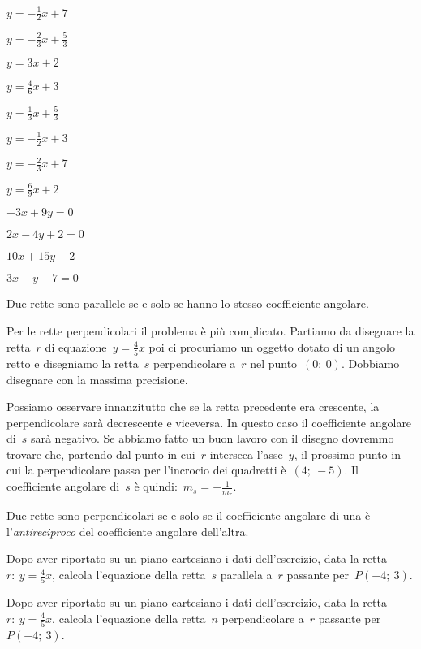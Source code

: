 \begin{multicols}{4}
 \TabPositions{0.6cm}
 \begin{enumeratea}
 \item \(y=-\frac{1}{2}x + 7\)
 \item \(y=-\frac{2}{3}x + \frac{5}{3}\)
 \item \(y={3}x + 2\)
 \item \(y=\frac{4}{6}x + 3\)
 \item \(y=\frac{1}{3}x + \frac{5}{3}\)
 \item \(y=-\frac{1}{2}x + 3\)
 \item \(y=-\frac{2}{3}x + 7\)
 \item \(y=\frac{6}{9}x + 2\)
 \item \(-3x + 9y = 0\)
 \item \(2x - 4y + 2 = 0\)
 \item \(10x + 15y + 2\)
 \item \(3x -y + 7 = 0\)
 \end{enumeratea}
\end{multicols}

\begin{definizione}
Due rette sono parallele se e solo se hanno lo stesso coefficiente angolare.
\end{definizione}

Per le rette perpendicolari il problema è più complicato. Partiamo da 
disegnare la retta~\(r\) di equazione~\(y = \frac{4}{5} x\) poi ci procuriamo 
un oggetto dotato di un angolo retto e disegniamo la retta~\(s\) perpendicolare 
a~\(r\) nel punto~\((0;~0)\). Dobbiamo disegnare con la massima precisione. 

Possiamo osservare innanzitutto che se la retta precedente era crescente, la 
perpendicolare sarà decrescente e viceversa. In questo caso il coefficiente 
angolare di~\(s\) sarà negativo. Se abbiamo fatto un buon lavoro con il disegno 
dovremmo trovare che, partendo dal punto in cui~\(r\) interseca l'asse~\(y\), il 
prossimo punto in cui la perpendicolare passa per l'incrocio dei quadretti 
è~\((4;~-5)\). Il coefficiente angolare di~\(s\) è quindi:~\(m_s = - \frac{1}{m_r}\).

\begin{definizione}
Due rette sono perpendicolari se e solo se il coefficiente angolare di 
una è l'\emph{antireciproco} del coefficiente angolare dell'altra.
\end{definizione}

\begin{exrig}
 \begin{esempio}
  Dopo aver riportato su un piano cartesiano i dati dell'esercizio,
  data la retta~\(r:~y = \frac{4}{5} x\), calcola l'equazione della retta~\(s\)  
  parallela a~\(r\) passante per~\(P(-4;~3)\).
 \end{esempio}
 \begin{esempio}
  Dopo aver riportato su un piano cartesiano i dati dell'esercizio,
  data la retta~\(r:~y = \frac{4}{5} x\), calcola l'equazione della retta~\(n\)  
  perpendicolare a~\(r\) passante per~\(P(-4;~3)\).
 \end{esempio}
\end{exrig}

